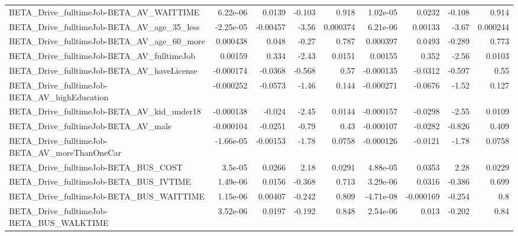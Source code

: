\begin{tabular}{lrrrrrrrr}
BETA\_Drive\_fulltimeJob-BETA\_AV\_WAITTIME            &    6.22e-06 &       0.0139 &   -0.103 &    0.918 &   1.02e-05 &      0.0232 &       -0.108 &         0.914 \\
BETA\_Drive\_fulltimeJob-BETA\_AV\_age\_35\_less         &   -2.25e-05 &     -0.00457 &    -3.56 & 0.000374 &   6.21e-06 &     0.00133 &        -3.67 &      0.000244 \\
BETA\_Drive\_fulltimeJob-BETA\_AV\_age\_60\_more         &    0.000438 &        0.048 &    -0.27 &    0.787 &   0.000397 &      0.0493 &       -0.289 &         0.773 \\
BETA\_Drive\_fulltimeJob-BETA\_AV\_fulltimeJob         &     0.00159 &        0.334 &    -2.43 &   0.0151 &    0.00155 &       0.352 &        -2.56 &        0.0103 \\
BETA\_Drive\_fulltimeJob-BETA\_AV\_haveLicense         &   -0.000174 &      -0.0368 &   -0.568 &     0.57 &  -0.000135 &     -0.0312 &       -0.597 &          0.55 \\
BETA\_Drive\_fulltimeJob-BETA\_AV\_highEducation       &   -0.000252 &      -0.0573 &    -1.46 &    0.144 &  -0.000271 &     -0.0676 &        -1.52 &         0.127 \\
BETA\_Drive\_fulltimeJob-BETA\_AV\_kid\_under18         &   -0.000138 &       -0.024 &    -2.45 &   0.0144 &  -0.000157 &     -0.0298 &        -2.55 &        0.0109 \\
BETA\_Drive\_fulltimeJob-BETA\_AV\_male                &   -0.000104 &      -0.0251 &    -0.79 &     0.43 &  -0.000107 &     -0.0282 &       -0.826 &         0.409 \\
BETA\_Drive\_fulltimeJob-BETA\_AV\_moreThanOneCar      &   -1.66e-05 &     -0.00153 &    -1.78 &   0.0758 &  -0.000126 &     -0.0121 &        -1.78 &        0.0758 \\
BETA\_Drive\_fulltimeJob-BETA\_BUS\_COST               &     3.5e-05 &       0.0266 &     2.18 &   0.0291 &   4.88e-05 &      0.0353 &         2.28 &        0.0229 \\
BETA\_Drive\_fulltimeJob-BETA\_BUS\_IVTIME             &    1.49e-06 &       0.0156 &   -0.368 &    0.713 &   3.29e-06 &      0.0316 &       -0.386 &         0.699 \\
BETA\_Drive\_fulltimeJob-BETA\_BUS\_WAITTIME           &    1.15e-06 &      0.00407 &   -0.242 &    0.809 &  -4.71e-08 &   -0.000169 &       -0.254 &           0.8 \\
BETA\_Drive\_fulltimeJob-BETA\_BUS\_WALKTIME           &    3.52e-06 &       0.0197 &   -0.192 &    0.848 &   2.54e-06 &       0.013 &       -0.202 &          0.84 \\

\end{tabular}
